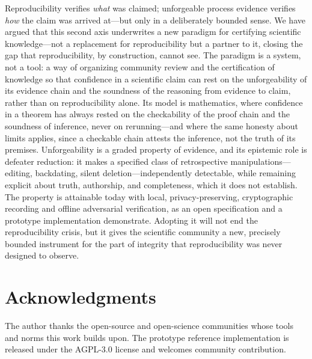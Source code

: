\documentclass[11pt]{article}
\begin{document}
Reproducibility verifies \emph{what} was claimed; unforgeable process evidence verifies
\emph{how} the claim was arrived at---but only in a deliberately bounded sense. We have
argued that this second axis underwrites a new paradigm for certifying scientific
knowledge---not a replacement for reproducibility but a partner to it, closing the gap that
reproducibility, by construction, cannot see. The paradigm is a system, not a tool: a
way of organizing community review and the certification of knowledge so that confidence
in a scientific claim can rest on the unforgeability of its evidence chain and the
soundness of the reasoning from evidence to claim, rather than on reproducibility
alone. Its model is mathematics, where confidence in a theorem has always rested on the
checkability of the proof chain and the soundness of inference, never on rerunning---and
where the same honesty about limits applies, since a checkable chain attests the
inference, not the truth of its premises. Unforgeability is a graded property of
evidence, and its epistemic role is defeater reduction: it makes a specified class of
retrospective manipulations---editing, backdating, silent deletion---independently
detectable, while remaining explicit about truth, authorship, and completeness, which it
does not establish. The property is attainable today with local, privacy-preserving,
cryptographic recording and offline adversarial verification, as an open specification
and a prototype implementation demonstrate. Adopting it will not end the reproducibility
crisis, but it gives the scientific community a new, precisely bounded instrument for the
part of integrity that reproducibility was never designed to observe.

\section*{Acknowledgments}
\label{sec:ack}
The author thanks the open-source and open-science communities whose tools and norms
this work builds upon. The prototype reference implementation is released under the
AGPL-3.0 license and welcomes community contribution.

\printbibliography
\end{document}

